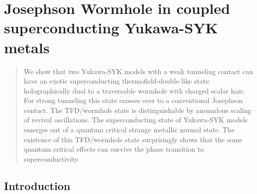 \renewcommand{\vec}[1]{{\boldsymbol #1}}
\renewcommand{\comment}[1]{[{\color{blue}{#1}}]} 
\def\nn{\nonumber\\}

\newcommand{\cind}[3]{c^{(#1)}_{#2}(#3)}
\newcommand{\cdag}[3]{{c^\dagger}^{(#1)}_{#2}(#3)}
\newcommand{\phind}[3]{\phi^{(#1)}_{#2}(#3)}
\newcommand{\sigmap}{\sigma^\prime}
\newcommand{\taup}{\tau^\prime}

\newcommand{\oemga}{\omega}
\newcommand{\tp}{t^\prime}


\chapter{Josephson Wormhole in coupled superconducting Yukawa-SYK metals}%
\label{chap:JosephsonWormhole}

\begin{abstract}
\noindent
We show that two Yukawa-SYK models with a weak tunneling contact can have an exotic superconducting thermofield-double-like state holographically dual to a traversable wormhole with charged scalar hair. 
For strong tunneling this state crosses over to a conventional Josephson contact. The TFD/wormhole state is distinguishable by anomalous scaling of revival oscillations. The superconducting state of Yukawa-SYK models emerges out of a quantum critical strange metallic normal state. The existence of this TFD/wormhole state surprisingly shows that the some quantum critical effects can survive the phase transition to superconductivity.
\end{abstract}


\section{Introduction}
\label{sec:introduction}

